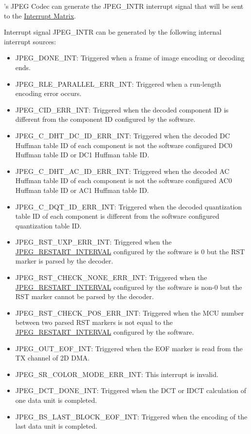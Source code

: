 \documentclass[main\_\_EN.tex]{subfiles}
\begin{document}
\chipname{}'s JPEG Codec can generate the JPEG\_INTR interrupt signal that will be sent to the \hyperref[mod:intmtrx]{Interrupt Matrix}.

Interrupt signal JPEG\_INTR can be generated by the following internal interrupt sources:
\begin{itemize}
\item JPEG\_DONE\_INT: Triggered when a frame of image encoding or decoding ends.
\item JPEG\_RLE\_PARALLEL\_ERR\_INT: Triggered when a run-length encoding error occurs.
\item JPEG\_CID\_ERR\_INT: Triggered when the decoded component ID is different from the component ID configured by the software.
\item JPEG\_C\_DHT\_DC\_ID\_ERR\_INT: Triggered when the decoded DC Huffman table ID of each component is not the software configured DC0 Huffman table ID or DC1 Huffman table ID.
\item JPEG\_C\_DHT\_AC\_ID\_ERR\_INT: Triggered when the decoded AC Huffman table ID of each component is not the software configured AC0 Huffman table ID or AC1 Huffman table ID.
\item JPEG\_C\_DQT\_ID\_ERR\_INT: Triggered when the decoded quantization table ID of each component is different from the software configured quantization table ID.
\item JPEG\_RST\_UXP\_ERR\_INT: Triggered when the \hyperref[fielddesc:JPEGRESTARTINTERVAL]{JPEG\_RESTART\_INTERVAL} configured by the software is 0 but the RST marker is parsed by the decoder.
\item JPEG\_RST\_CHECK\_NONE\_ERR\_INT: Triggered when the \hyperref[fielddesc:JPEGRESTARTINTERVAL]{JPEG\_RESTART\_INTERVAL} configured by the software is non-0 but the RST marker cannot be parsed by the decoder.
\item JPEG\_RST\_CHECK\_POS\_ERR\_INT: Triggered when the MCU number between two parsed RST markers is not equal to the \hyperref[fielddesc:JPEGRESTARTINTERVAL]{JPEG\_RESTART\_INTERVAL} configured by the software.
\item JPEG\_OUT\_EOF\_INT: Triggered when the EOF marker is read from the TX channel of 2D DMA.
\item JPEG\_SR\_COLOR\_MODE\_ERR\_INT: This interrupt is invalid.
\item JPEG\_DCT\_DONE\_INT: Triggered when the DCT or IDCT calculation of one data unit is completed.
\item JPEG\_BS\_LAST\_BLOCK\_EOF\_INT: Triggered when the encoding of the last data unit is completed.

\end{itemize}
\end{document}
